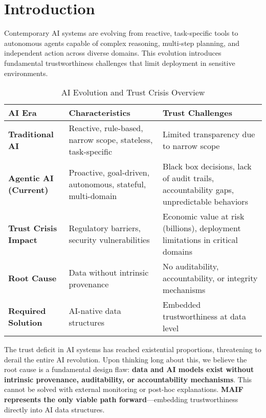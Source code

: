 \documentclass[conference]{IEEEtran}
\begin{document}
\section{Introduction}

Contemporary AI systems are evolving from reactive, task-specific tools to autonomous agents capable of complex reasoning, multi-step planning, and independent action across diverse domains. This evolution introduces fundamental trustworthiness challenges that limit deployment in sensitive environments.

\begin{table*}[!t]
\renewcommand{\arraystretch}{1.3}
\caption{AI Evolution and Trust Crisis Overview}
\label{tab:ai-evolution-crisis}
\centering
\footnotesize
\begin{tabular}{p{3cm}p{5cm}p{6cm}}
\toprule
\textbf{AI Era} & \textbf{Characteristics} & \textbf{Trust Challenges} \\
\midrule
\textbf{Traditional AI} & Reactive, rule-based, narrow scope, stateless, task-specific & Limited transparency due to narrow scope \\
\textbf{Agentic AI (Current)} & Proactive, goal-driven, autonomous, stateful, multi-domain & Black box decisions, lack of audit trails, accountability gaps, unpredictable behaviors \\
\textbf{Trust Crisis Impact} & Regulatory barriers, security vulnerabilities & Economic value at risk (billions), deployment limitations in critical domains \\
\textbf{Root Cause} & Data without intrinsic provenance & No auditability, accountability, or integrity mechanisms \\
\textbf{Required Solution} & AI-native data structures & Embedded trustworthiness at data level \\
\bottomrule
\end{tabular}
\end{table*}

The trust deficit in AI systems has reached existential proportions, threatening to derail the entire AI revolution. Upon thinking long about this, we believe the root cause is a fundamental design flaw: \textbf{data and AI models exist without intrinsic provenance, auditability, or accountability mechanisms}. This cannot be solved with external monitoring or post-hoc explanations. \textbf{MAIF represents the only viable path forward}—embedding trustworthiness directly into AI data structures.
\end{document}
